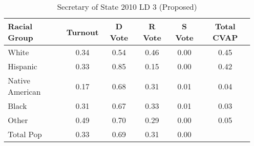 \begin{table}[htb]
\begin{center}
\caption{Secretary of State 2010 LD 3 (Proposed)}
\label{sos10_cvap_ld_3}
\begin{tabular}{lccccc}
  \hline
Racial Group & Turnout & D Vote & R Vote & S Vote & Total CVAP \\ 
  \hline
White & 0.34 & 0.54 & 0.46 & 0.00 & 0.45 \\ 
  Hispanic & 0.33 & 0.85 & 0.15 & 0.00 & 0.42 \\ 
  Native American & 0.17 & 0.68 & 0.31 & 0.01 & 0.04 \\ 
  Black & 0.31 & 0.67 & 0.33 & 0.01 & 0.03 \\ 
  Other & 0.49 & 0.70 & 0.29 & 0.00 & 0.05 \\ 
  Total Pop & 0.33 & 0.69 & 0.31 & 0.00 &  \\ 
   \hline
\end{tabular}
\end{center}
\end{table}
